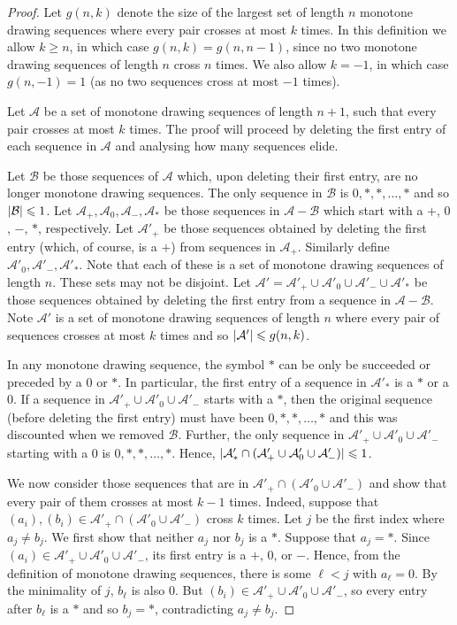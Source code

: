\documentclass[a4paper,11pt]{article}
\renewcommand{\geq}{\geqslant}
\renewcommand{\leq}{\leqslant}
\DeclarePairedDelimiter{\abs}{\lvert}{\rvert} %
\renewcommand{\AA}{\mathcal{A}}
\newcommand{\BB}{\mathcal{B}}
\begin{document}
\begin{proof}
    Let $g(n, k)$ denote the size of the largest set of length $n$ monotone drawing sequences where every pair crosses at most $k$ times. In this definition we allow $k \geq n$, in which case $g(n, k) = g(n, n - 1)$, since no two monotone drawing sequences of length $n$ cross $n$ times. We also allow $k = -1$, in which case $g(n, -1) = 1$ (as no two sequences cross at most $-1$ times).

    Let $\AA$ be a set of monotone drawing sequences of length $n + 1$, such that every pair crosses at most $k$ times. The proof will proceed by deleting the first entry of each sequence in $\AA$ and analysing how many sequences elide.

    Let $\BB$ be those sequences of $\AA$ which, upon deleting their first entry, are no longer monotone drawing sequences. The only sequence in $\BB$ is $0, \ast, \ast, \dots, \ast$ and so $\abs{\BB} \leq 1$. Let $\AA_{+}, \AA_{0}, \AA_{-}, \AA_{\ast}$ be those sequences in $\AA - \BB$ which start with a $+$, $0$, $-$, $\ast$, respectively. Let $\AA'_{+}$ be those sequences obtained by deleting the first entry (which, of course, is a $+$) from sequences in $\AA_{+}$. Similarly define $\AA'_{0}, \AA'_{-}, \AA'_{\ast}$. Note that each of these is a set of monotone drawing sequences of length $n$. These sets may not be disjoint. Let $\AA' = \AA'_{+} \cup \AA'_{0} \cup \AA'_{-} \cup \AA'_{\ast}$ be those sequences obtained by deleting the first entry from a sequence in $\AA - \BB$. Note $\AA'$ is a set of monotone drawing sequences of length $n$ where every pair of sequences crosses at most $k$ times and so $\abs{\AA'} \leq g(n, k)$.

    In any monotone drawing sequence, the symbol $\ast$ can be only be succeeded or preceded by a $0$ or $\ast$. In particular, the first entry of a sequence in $\AA'_{\ast}$ is a $\ast$ or a $0$. If a sequence in $\AA'_{+} \cup \AA'_{0} \cup \AA'_{-}$ starts with a $\ast$, then the original sequence (before deleting the first entry) must have been $0, \ast, \ast, \dotsc, \ast$ and this was discounted when we removed $\BB$. Further, the only sequence in $\AA'_{+} \cup \AA'_{0} \cup \AA'_{-}$ starting with a $0$ is $0, \ast, \ast, \dotsc, \ast$. Hence, $\abs{\AA'_{\ast} \cap (\AA'_{+} \cup \AA'_{0} \cup \AA'_{-})} \leq 1$.

    We now consider those sequences that are in $\AA'_{+} \cap (\AA'_{0} \cup \AA'_{-})$ and show that every pair of them crosses at most $k - 1$ times. Indeed, suppose that $(a_i), (b_i) \in \AA'_{+} \cap (\AA'_{0} \cup \AA'_{-})$ cross $k$ times. Let $j$ be the first index where $a_j \neq b_j$.  We first show that neither $a_j$ nor $b_j$ is a $\ast$. Suppose that $a_j = \ast$. Since $(a_i) \in \AA'_{+} \cup \AA'_{0} \cup \AA'_{-}$, its first entry is a $+$, $0$, or $-$. Hence, from the definition of monotone drawing sequences, there is some $\ell < j$ with $a_\ell = 0$. By the minimality of $j$, $b_\ell$ is also $0$. But $(b_i) \in \AA'_{+} \cup \AA'_{0} \cup \AA'_{-}$, so every entry after $b_\ell$ is a $\ast$ and so $b_j = \ast$, contradicting $a_j \neq b_j$. 


\end{proof}
\end{document}
